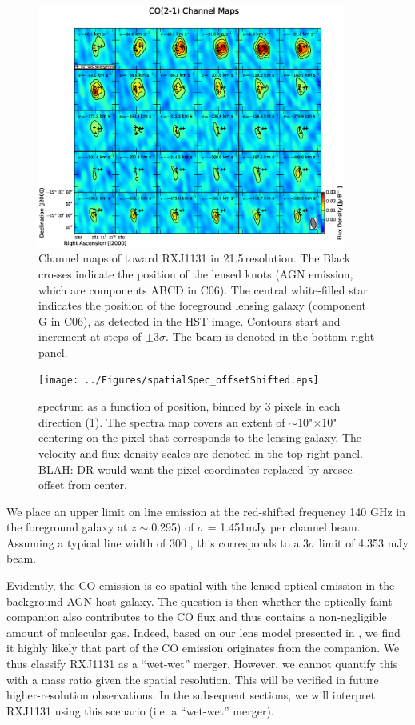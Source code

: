\documentclass[]{emulateapj}
\begin{document}
\begin{figure}[!htbp]
\centering
\includegraphics[width=0.9\textwidth]{../Figures/co_channel_maps.eps}
\caption{
Channel maps of \pdbi \bco toward RXJ1131 in 21.5\,\kms resolution. The
Black crosses indicate the position of the lensed knots (AGN emission,
which are components ABCD in C06). The central white-filled
star indicates the position of the foreground lensing galaxy (component G
in C06), as detected in the HST image. Contours start and increment at steps of
$\pm$3$\sigma$. The beam is denoted in the bottom right panel. \label{fig:chanmap}}
\end{figure}

\begin{figure}[!htbp]
\centering
\texttt{[image: ../Figures/spatialSpec\_offsetShifted.eps]}
\caption{
\bco spectrum as a function of position, binned by 3 pixels in each
direction (1). The spectra map covers an extent of $\sim$10"$\times$10"
centering on the pixel that corresponds to the lensing galaxy. The velocity
and flux density scales are denoted in the top right panel.
BLAH: DR would want the pixel coordinates replaced by arcsec offset from
center. \label{fig:spatialSpec}}
\end{figure}

We place an upper limit on  line emission at the red-shifted
frequency 140 GHz in the foreground galaxy at $z\sim$0.295) of
$\sigma$ = 1.451mJy per channel beam\pmOne.
Assuming a typical line width of 300 \kms, this corresponds to a 3$\sigma$
limit of 4.353 mJy \kms beam\pmOne.

 \label{sec:origin} %
Evidently, the CO emission is co-spatial with the lensed optical emission in
the background AGN host galaxy. The question is then whether the optically
faint companion also contributes to the CO flux and thus contains a
non-negligible amount of molecular gas.
Indeed, based on our lens model presented in , we find it
highly likely that part of the CO emission originates from
the companion. We thus classify RXJ1131 as a ``wet-wet'' merger.
However, we cannot quantify this with a mass ratio given the
spatial resolution. This will be verified in future higher-resolution observations. In the subsequent sections, we will interpret RXJ1131
using this scenario (i.e. a ``wet-wet'' merger).
\end{document}
